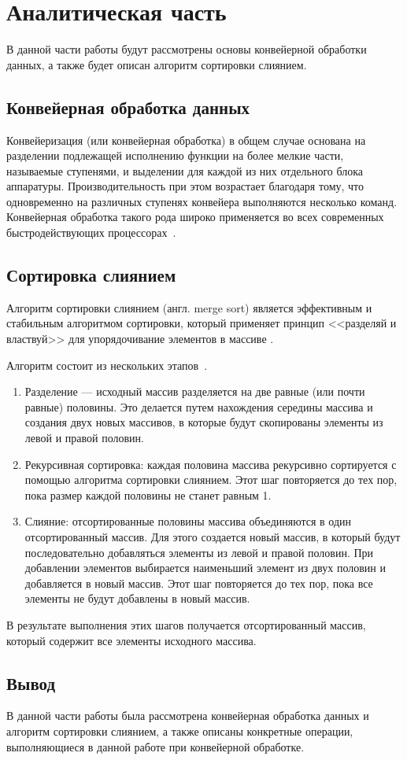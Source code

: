\chapter{Аналитическая часть}
В данной части работы будут рассмотрены основы конвейерной обработки данных, а также будет описан алгоритм сортировки слиянием.

\section{Конвейерная обработка данных}
Конвейеризация (или конвейерная обработка) в общем случае основана на разделении подлежащей исполнению функции на более мелкие части, называемые ступенями, и выделении для каждой из них отдельного блока аппаратуры.
Производительность при этом возрастает благодаря тому, что одновременно на различных ступенях конвейера выполняются несколько команд.
Конвейерная обработка такого рода широко применяется во всех современных быстродействующих процессорах~\cite{conveyor_desc}.

\section{Сортировка слиянием}
Алгоритм сортировки слиянием (англ. merge sort) является эффективным и стабильным алгоритмом сортировки, который применяет принцип <<разделяй и властвуй>> для упорядочивание элементов в массиве \cite{merge-sort}.

Алгоритм состоит из нескольких этапов~\cite{merge-sort}.
\begin{enumerate}
	\item Разделение ---  исходный массив разделяется на две равные (или почти равные) половины.
	Это делается путем нахождения середины массива и создания двух новых массивов, в которые будут скопированы элементы из левой и правой половин.
	
	\item Рекурсивная сортировка: каждая половина массива рекурсивно сортируется с помощью алгоритма сортировки слиянием.
	Этот шаг повторяется до тех пор, пока размер каждой половины не станет равным 1.
	
	\item Слияние: отсортированные половины массива объединяются в один отсортированный массив.
	Для этого создается новый массив, в который будут последовательно добавляться элементы из левой и правой половин.
	При добавлении элементов выбирается наименьший элемент из двух половин и добавляется в новый массив.
	Этот шаг повторяется до тех пор, пока все элементы не будут добавлены в новый массив.
\end{enumerate}
В результате выполнения этих шагов получается отсортированный массив, который содержит все элементы исходного массива.



\section*{Вывод}
В данной части работы была рассмотрена конвейерная обработка данных и алгоритм сортировки слиянием, а также описаны конкретные операции, выполняющиеся в данной работе при конвейерной обработке.
